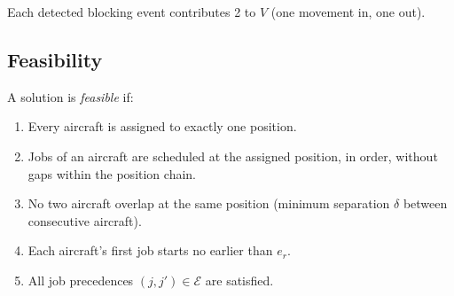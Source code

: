 Each detected blocking event contributes 2 to $V$ (one movement in, one out).

\subsection{Feasibility}

A solution is \emph{feasible} if:
\begin{enumerate}[noitemsep]
    \item Every aircraft is assigned to exactly one position.
    \item Jobs of an aircraft are scheduled at the assigned position, in order,
          without gaps within the position chain.
    \item No two aircraft overlap at the same position (minimum separation $\delta$
          between consecutive aircraft).
    \item Each aircraft's first job starts no earlier than $e_r$.
    \item All job precedences $(j, j') \in \mathcal{E}$ are satisfied.
\end{enumerate}
